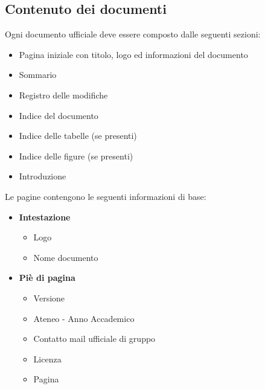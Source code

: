 {	\subsection{Contenuto dei documenti}{
		Ogni documento ufficiale deve essere composto dalle seguenti sezioni:
		\begin{itemize}
			\item Pagina iniziale con titolo, logo ed informazioni del documento
			\item Sommario
			\item Registro delle modifiche
			\item Indice del documento
			\item Indice delle tabelle (se presenti)
			\item Indice delle figure (se presenti)
			\item Introduzione
		\end{itemize}
		Le pagine contengono le seguenti informazioni di base:
		\begin{itemize}
			\item[] \textbf{Intestazione}
				\begin{itemize}
					\item Logo
					\item Nome documento
				\end{itemize}
			\item[] \textbf{Piè di pagina}
				\begin{itemize}
					\item Versione
					\item Ateneo - Anno Accademico
					\item Contatto mail ufficiale di gruppo
					\item Licenza
					\item Pagina
				\end{itemize}
		\end{itemize}
	}
}